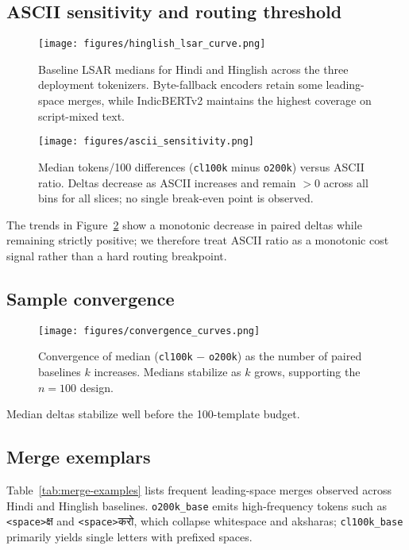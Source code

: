 \documentclass{article}
\newcommand{\devtxt}[1]{{\devanagarifont#1}}
\renewcommand{\textvisiblespace}{\texttt{\textless{}space\textgreater{}}}
\begin{document}
\subsection{ASCII sensitivity and routing threshold}
\begin{figure}[t]
    \centering
    \texttt{[image: figures/hinglish\_lsar\_curve.png]}
    \caption{Baseline LSAR medians for Hindi and Hinglish across the three deployment tokenizers. Byte-fallback encoders retain some leading-space merges, while IndicBERTv2 maintains the highest coverage on script-mixed text.}\label{fig:hinglish-lsar}
\end{figure}
\begin{figure}[t]
    \centering
    \texttt{[image: figures/ascii\_sensitivity.png]}
    \caption{Median tokens/100 differences (\texttt{cl100k} minus \texttt{o200k}) versus ASCII ratio. Deltas decrease as ASCII increases and remain $>0$ across all bins for all slices; no single break-even point is observed.}\label{fig:ascii-sensitivity}
\end{figure}
The trends in Figure~\ref{fig:ascii-sensitivity} show a monotonic decrease in paired deltas while remaining strictly positive; we therefore treat ASCII ratio as a monotonic cost signal rather than a hard routing breakpoint.

\subsection{Sample convergence}
\begin{figure}[t]
    \centering
    \texttt{[image: figures/convergence\_curves.png]}
    \caption{Convergence of median (\texttt{cl100k} $-$ \texttt{o200k}) as the number of paired baselines $k$ increases. Medians stabilize as $k$ grows, supporting the $n=100$ design.}\label{fig:convergence}
\end{figure}

Median deltas stabilize well before the 100-template budget.

\subsection{Merge exemplars}
Table~\ref{tab:merge-examples} lists frequent leading-space merges observed across Hindi and Hinglish baselines. \texttt{o200k\_base} emits high-frequency tokens such as {\textvisiblespace}\devtxt{क्ष} and {\textvisiblespace}\devtxt{करो}, which collapse whitespace and aksharas; \texttt{cl100k\_base} primarily yields single letters with prefixed spaces.
\begin{table}[t]
    \centering
    \caption{Frequent space-prefixed merges observed across Hindi/Hinglish baselines. {\textvisiblespace} denotes a leading space.}\label{tab:merge-examples}
    
\end{table}
\end{document}
